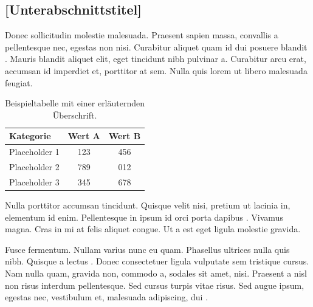 \subsection{[Unterabschnittstitel]}

Donec sollicitudin molestie malesuada. Praesent sapien massa, convallis a pellentesque nec, egestas non nisi. Curabitur aliquet quam id dui posuere blandit \cite{DummyBook2024}. Mauris blandit aliquet elit, eget tincidunt nibh pulvinar a. Curabitur arcu erat, accumsan id imperdiet et, porttitor at sem. Nulla quis lorem ut libero malesuada feugiat.

\begin{table}[H]
    \centering
    \caption{Beispieltabelle mit einer erläuternden Überschrift.}
    \label{tab:beispiel}
    \begin{tabular}{lcc}
        \toprule
        \textbf{Kategorie} & \textbf{Wert A} & \textbf{Wert B} \\
        \midrule
        Placeholder 1 & 123 & 456 \\
        Placeholder 2 & 789 & 012 \\
        Placeholder 3 & 345 & 678 \\
        \bottomrule
    \end{tabular}
\end{table}

Nulla porttitor accumsan tincidunt. Quisque velit nisi, pretium ut lacinia in, elementum id enim. Pellentesque in ipsum id orci porta dapibus \cite{DummyMisc2024}. Vivamus magna. Cras in mi at felis aliquet congue. Ut a est eget ligula molestie gravida.

Fusce fermentum. Nullam varius nunc eu quam. Phasellus ultrices nulla quis nibh. Quisque a lectus \cite{DummyArticle2024}. Donec consectetuer ligula vulputate sem tristique cursus. Nam nulla quam, gravida non, commodo a, sodales sit amet, nisi. Praesent a nisl non risus interdum pellentesque. Sed cursus turpis vitae risus. Sed augue ipsum, egestas nec, vestibulum et, malesuada adipiscing, dui \cite{DummyBook2024}.

